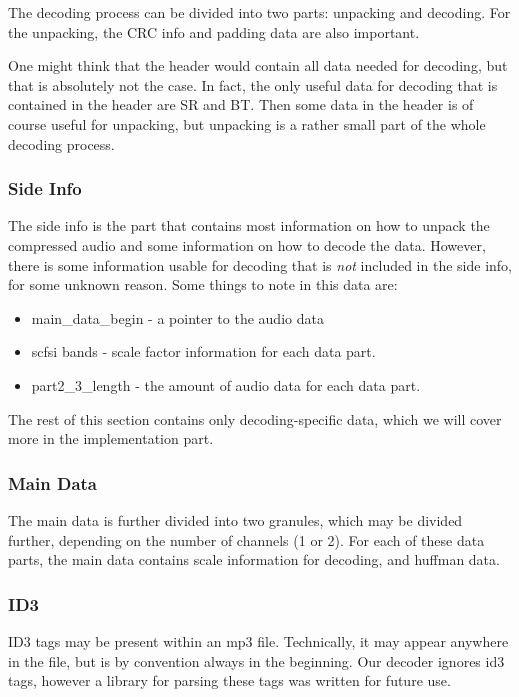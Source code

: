 \documentclass[a4paper,12pt]{article}
\begin{document}
            The decoding process can be divided into two parts: unpacking and
            decoding. For the unpacking, the CRC info and padding data are also
            important.

            One might think that the header would contain all data needed for
            decoding, but that is absolutely not the case. In fact, the only
            useful data for decoding that is contained in the header are SR and
            BT. Then some data in the header is of course useful for unpacking,
            but unpacking is a rather small part of the whole decoding process.

       \subsubsection{Side Info}
            The side info is the part that contains most information on how to
            unpack the compressed audio and some information on how to decode
            the data. However, there is some information usable for decoding
            that is \textit{not} included in the side info, for some unknown
            reason. Some things to note in this data are:
            \begin{itemize}
                \item main\_data\_begin - a pointer to the audio data
                \item scfsi bands - scale factor information for each data part.
                \item part2\_3\_length - the amount of audio data for each
                      data part.
            \end{itemize}
            The rest of this section contains only decoding-specific data, which
            we will cover more in the implementation part.

       \subsubsection{Main Data}
            The main data is further divided into two granules, which may be
            divided further, depending on the number of channels (1 or 2). For
            each of these data parts, the main data contains scale information
            for decoding, and huffman data.

        \subsubsection{ID3}
            ID3 tags may be present within an mp3 file. Technically, it may
            appear anywhere in the file, but is by convention always in the
            beginning. Our decoder ignores id3 tags, however a library for
            parsing these tags was written for future use.
\end{document}
